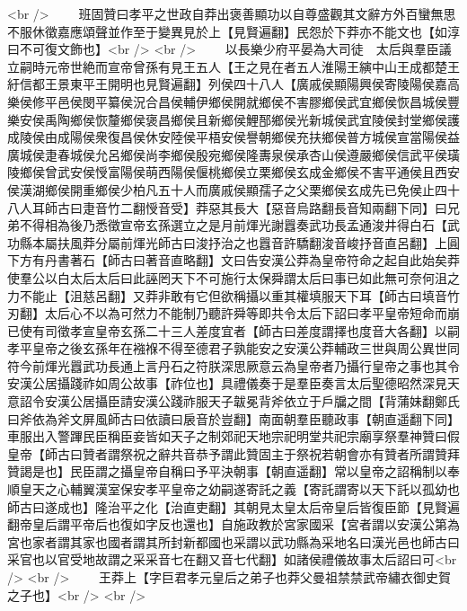 <br />
　　班固贊曰孝平之世政自莽出褒善顯功以自尊盛觀其文辭方外百蠻無思不服休徵嘉應頌聲並作至于變異見於上【見賢遍翻】民怨於下莽亦不能文也【如淳曰不可復文飾也】<br />
<br />
　　以長樂少府平晏為大司徒　太后與羣臣議立嗣時元帝世絶而宣帝曾孫有見王五人【王之見在者五人淮陽王縯中山王成都楚王紆信都王景東平王開明也見賢遍翻】列侯四十八人【廣戚侯顯陽興侯寄陵陽侯嘉高樂侯修平邑侯閔平纂侯況合昌侯輔伊鄉侯開就鄉侯不害膠鄉侯武宜鄉侯恢昌城侯豐樂安侯禹陶鄉侯恢釐鄉侯褒昌鄉侯且新鄉侯鯉郚鄉侯光新城侯武宜陵侯封堂鄉侯護成陵侯由成陽侯衆復昌侯休安陸侯平梧安侯譽朝鄉侯充扶鄉侯普方城侯宣當陽侯益廣城侯疌春城侯允呂鄉侯尚李鄉侯殷宛鄉侯隆夀泉侯承杏山侯遵嚴鄉侯信武平侯璜陵鄉侯曾武安侯㥅富陽侯萌西陽侯偃桃鄉侯立栗鄉侯玄成金鄉侯不害平通侯且西安侯漢湖鄉侯開重鄉侯少柏凡五十人而廣戚侯顯孺子之父栗鄉侯玄成先已免侯止四十八人耳師古曰疌音竹二翻㥅音受】莽惡其長大【惡音烏路翻長音知兩翻下同】曰兄弟不得相為後乃悉徵宣帝玄孫選立之是月前煇光謝囂奏武功長孟通浚井得白石【武功縣本屬扶風莽分屬前煇光師古曰浚抒治之也囂音許驕翻浚音峻抒音直呂翻】上圓下方有丹書著石【師古曰著音直略翻】文曰告安漢公莽為皇帝符命之起自此始矣莽使羣公以白太后太后曰此誣罔天下不可施行太保舜謂太后曰事已如此無可奈何沮之力不能止【沮慈呂翻】又莽非敢有它但欲稱攝以重其權填服天下耳【師古曰填音竹刃翻】太后心不以為可然力不能制乃聽許舜等即共令太后下詔曰孝平皇帝短命而崩已使有司徵孝宣皇帝玄孫二十三人差度宜者【師古曰差度謂擇也度音大各翻】以嗣孝平皇帝之後玄孫年在襁褓不得至德君子孰能安之安漢公莽輔政三世與周公異世同符今前煇光囂武功長通上言丹石之符朕深思厥意云為皇帝者乃攝行皇帝之事也其令安漢公居攝踐祚如周公故事【祚位也】具禮儀奏于是羣臣奏言太后聖德昭然深見天意詔令安漢公居攝臣請安漢公踐祚服天子韍冕背斧依立于戶牖之間【背蒲妹翻鄭氏曰斧依為斧文屏風師古曰依讀曰扆音於豈翻】南面朝羣臣聽政事【朝直遥翻下同】車服出入警蹕民臣稱臣妾皆如天子之制郊祀天地宗祀明堂共祀宗廟享祭羣神贊曰假皇帝【師古曰贊者謂祭祝之辭共音恭予謂此贊固主于祭祝若朝會亦有贊者所謂贊拜贊謁是也】民臣謂之攝皇帝自稱曰予平決朝事【朝直遥翻】常以皇帝之詔稱制以奉順皇天之心輔翼漢室保安孝平皇帝之幼嗣遂寄託之義【寄託謂寄以天下託以孤幼也師古曰遂成也】隆治平之化【治直吏翻】其朝見太皇太后帝皇后皆復臣節【見賢遍翻帝皇后謂平帝后也復如字反也還也】自施政教於宮家國采【宮者謂以安漢公第為宮也家者謂其家也國者謂其所封新都國也采謂以武功縣為采地名曰漢光邑也師古曰采官也以官受地故謂之采采音七在翻又音七代翻】如諸侯禮儀故事太后詔曰可<br />
<br />
　　王莽上【字巨君孝元皇后之弟子也莽父曼祖禁禁武帝繡衣御史賀之子也】<br />
<br />
